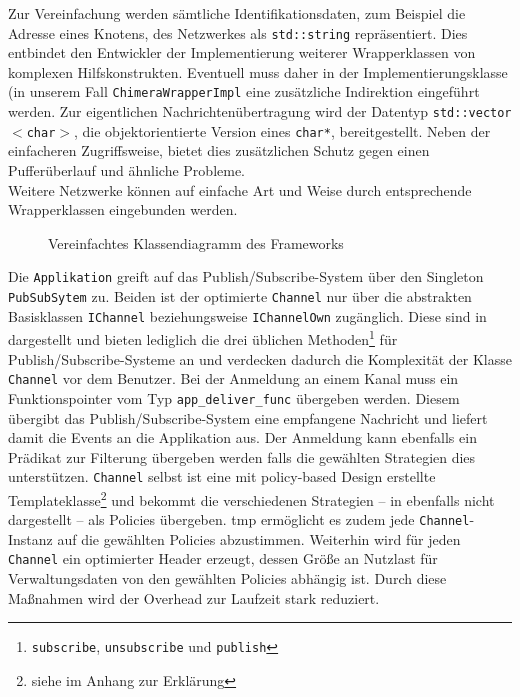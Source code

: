 Zur Vereinfachung werden sämtliche Identifikationsdaten, zum Beispiel die Adresse eines Knotens, des Netzwerkes als \texttt{std::string} repräsentiert. Dies entbindet den Entwickler der Implementierung weiterer Wrapperklassen von komplexen Hilfskonstrukten. Eventuell muss daher in der Implementierungsklasse (in unserem Fall \texttt{ChimeraWrapperImpl} eine zusätzliche Indirektion eingeführt werden. Zur eigentlichen Nachrichtenübertragung wird der Datentyp \texttt{std::vector$<$char$>$}, die objektorientierte Version eines \texttt{char*}, bereitgestellt. Neben der einfacheren Zugriffsweise, bietet dies zusätzlichen Schutz gegen einen Pufferüberlauf und ähnliche Probleme.\\
Weitere Netzwerke können auf einfache Art und Weise durch entsprechende Wrapperklassen eingebunden werden.

\begin{figure}[htbp]
\centering
{}
\caption{Vereinfachtes Klassendiagramm des Frameworks}
\label{fig:uml}
\end{figure}

Die \texttt{Applikation} greift auf das Publish/Subscribe-System über den Singleton \texttt{PubSub\-Sytem} zu. Beiden ist der optimierte \texttt{Channel} nur über die abstrakten Basisklassen \texttt{IChannel} beziehungsweise \texttt{IChannelOwn} zugänglich. Diese sind in  dargestellt und bieten lediglich die drei üblichen Methoden\footnote{\texttt{subscribe}, \texttt{unsubscribe} und \texttt{publish}} für Publish/Subscribe-Systeme an und verdecken dadurch die Komplexität der Klasse \texttt{Channel} vor dem Benutzer. Bei der Anmeldung an einem Kanal muss ein Funktionspointer vom Typ \texttt{app\_deliver\_func} übergeben werden. Diesem übergibt das Publish/Subscribe-System eine empfangene Nachricht und liefert damit die Events an die Applikation aus. Der Anmeldung kann ebenfalls ein Prädikat zur Filterung übergeben werden falls die gewählten Strategien dies unterstützen. \texttt{Channel} selbst ist eine mit policy-based Design erstellte Templateklasse\footnote{siehe  im Anhang zur Erklärung} und bekommt die verschiedenen Strategien -- in  ebenfalls nicht dargestellt -- als Policies übergeben. \ac{tmp} ermöglicht es zudem jede \texttt{Channel}-Instanz auf die gewählten Policies abzustimmen. Weiterhin wird für jeden \texttt{Channel} ein optimierter Header erzeugt, dessen Größe an Nutzlast für Verwaltungsdaten von den gewählten Policies abhängig ist. Durch diese Maßnahmen wird der Overhead zur Laufzeit stark reduziert. 


